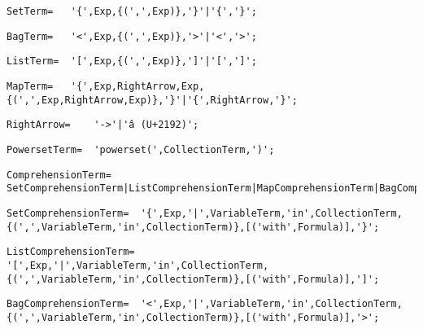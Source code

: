 \documentclass{article}
\begin{document}
    \begin{lstlisting}[mathescape=true]
     SetTerm= 	'{',Exp,{(',',Exp)},'}'|'{','}';
    \end{lstlisting}
    
    \begin{lstlisting}[mathescape=true]
     BagTerm= 	'<',Exp,{(',',Exp)},'>'|'<','>';
    \end{lstlisting}
    
    \begin{lstlisting}[mathescape=true]
     ListTerm= 	'[',Exp,{(',',Exp)},']'|'[',']';
    \end{lstlisting}
    
    \begin{lstlisting}[mathescape=true]
     MapTerm= 	'{',Exp,RightArrow,Exp,{(',',Exp,RightArrow,Exp)},'}'|'{',RightArrow,'}';
    \end{lstlisting}
    
    \begin{lstlisting}[mathescape=true]
     RightArrow= 	'->'|'â (U+2192)';
    \end{lstlisting}
    
    \begin{lstlisting}[mathescape=true]
     PowersetTerm= 	'powerset(',CollectionTerm,')';
    \end{lstlisting}
    
    \begin{lstlisting}[mathescape=true]
     ComprehensionTerm= 	SetComprehensionTerm|ListComprehensionTerm|MapComprehensionTerm|BagComprehensionTerm|NumberRangeTerm;
    \end{lstlisting}
    
    \begin{lstlisting}[mathescape=true]
     SetComprehensionTerm= 	'{',Exp,'|',VariableTerm,'in',CollectionTerm,{(',',VariableTerm,'in',CollectionTerm)},[('with',Formula)],'}';
    \end{lstlisting}
    
    \begin{lstlisting}[mathescape=true]
     ListComprehensionTerm= 	'[',Exp,'|',VariableTerm,'in',CollectionTerm,{(',',VariableTerm,'in',CollectionTerm)},[('with',Formula)],']';
    \end{lstlisting}
    
    \begin{lstlisting}[mathescape=true]
     BagComprehensionTerm= 	'<',Exp,'|',VariableTerm,'in',CollectionTerm,{(',',VariableTerm,'in',CollectionTerm)},[('with',Formula)],'>';
    \end{lstlisting}
    
\end{document}
